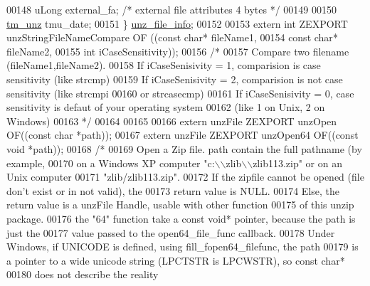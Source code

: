 \begin{DoxyCode}
00148     uLong external\_fa;          \textcolor{comment}{/* external file attributes        4 bytes */}
00149 
00150     \hyperlink{structtm__unz__s}{tm\_unz} tmu\_date;
00151 \} \hyperlink{structunz__file__info__s}{unz\_file\_info};
00152 
00153 \textcolor{keyword}{extern} \textcolor{keywordtype}{int} ZEXPORT unzStringFileNameCompare OF ((\textcolor{keyword}{const} \textcolor{keywordtype}{char}* fileName1,
00154                                                  \textcolor{keyword}{const} \textcolor{keywordtype}{char}* fileName2,
00155                                                  \textcolor{keywordtype}{int} iCaseSensitivity));
00156 \textcolor{comment}{/*}
00157 \textcolor{comment}{   Compare two filename (fileName1,fileName2).}
00158 \textcolor{comment}{   If iCaseSenisivity = 1, comparision is case sensitivity (like strcmp)}
00159 \textcolor{comment}{   If iCaseSenisivity = 2, comparision is not case sensitivity (like strcmpi}
00160 \textcolor{comment}{                                or strcasecmp)}
00161 \textcolor{comment}{   If iCaseSenisivity = 0, case sensitivity is defaut of your operating system}
00162 \textcolor{comment}{    (like 1 on Unix, 2 on Windows)}
00163 \textcolor{comment}{*/}
00164 
00165 
00166 \textcolor{keyword}{extern} unzFile ZEXPORT unzOpen OF((\textcolor{keyword}{const} \textcolor{keywordtype}{char} *path));
00167 \textcolor{keyword}{extern} unzFile ZEXPORT unzOpen64 OF((\textcolor{keyword}{const} \textcolor{keywordtype}{void} *path));
00168 \textcolor{comment}{/*}
00169 \textcolor{comment}{  Open a Zip file. path contain the full pathname (by example,}
00170 \textcolor{comment}{     on a Windows XP computer "c:\(\backslash\)\(\backslash\)zlib\(\backslash\)\(\backslash\)zlib113.zip" or on an Unix computer}
00171 \textcolor{comment}{     "zlib/zlib113.zip".}
00172 \textcolor{comment}{     If the zipfile cannot be opened (file don't exist or in not valid), the}
00173 \textcolor{comment}{       return value is NULL.}
00174 \textcolor{comment}{     Else, the return value is a unzFile Handle, usable with other function}
00175 \textcolor{comment}{       of this unzip package.}
00176 \textcolor{comment}{     the "64" function take a const void* pointer, because the path is just the}
00177 \textcolor{comment}{       value passed to the open64\_file\_func callback.}
00178 \textcolor{comment}{     Under Windows, if UNICODE is defined, using fill\_fopen64\_filefunc, the path}
00179 \textcolor{comment}{       is a pointer to a wide unicode string (LPCTSTR is LPCWSTR), so const char*}
00180 \textcolor{comment}{       does not describe the reality}

\end{DoxyCode}
